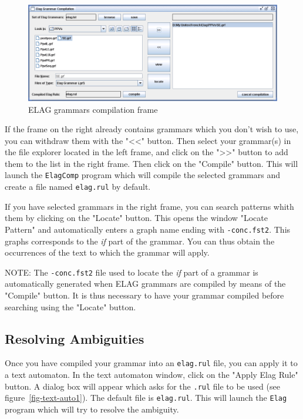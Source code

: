 \begin{figure}[!ht]
\begin{center}
\includegraphics[width=15cm]{resources/img/fig7-16.png}
\caption{ELAG grammars compilation frame\label{fig-elag-rules}}
\end{center}
\end{figure}

\bigskip
\noindent If the frame on the right already contains grammars which you don't
wish to use, you can withdraw them with the "<<" button. Then select your
grammar(s) in the file explorer located in the left frame, and click on the
">>" button to add them to the list in the right frame. Then click on the
"Compile" button. This will launch the \verb+ElagComp+ program
 which will compile the selected grammars and create a file named
\verb+elag.rul+ by default.

\bigskip
\noindent If you have selected grammars in the right frame, you can search patterns whith
them by clicking on the "Locate" button. This opens the window "Locate
Pattern" and automatically enters a graph name ending with
\verb+-conc.fst2+. This graphs corresponds to the
\textit{if} part of the grammar. You can thus obtain the occurrences of the
text to which the grammar will apply.

\bigskip
\noindent NOTE: The \verb+-conc.fst2+ file used to locate the \textit{if} part
of a grammar is automatically generated when ELAG grammars are compiled by means
of the "Compile" button. It is thus necessary to have your grammar
compiled before searching using the "Locate" button.


\subsection{Resolving Ambiguities}
Once you have compiled your grammar into an \verb+elag.rul+ file, you can apply
it to a text automaton. In the text automaton window, click on the "Apply Elag
Rule" button. A dialog box will appear which asks for the \verb+.rul+ file
to be used (see figure~\ref{fig-text-auto1}). The default file is
\verb+elag.rul+. This will launch the \verb+Elag+ program  which
will try to resolve the ambiguity.

